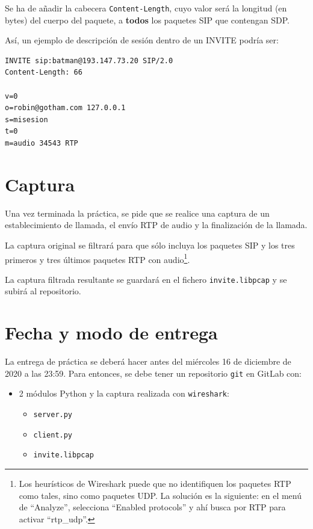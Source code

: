 \documentclass[a4paper,11pt]{article}
\begin{document}
Se ha de añadir la cabecera \texttt{Content-Length}, cuyo valor será la longitud (en bytes) del cuerpo del paquete, a {\bf todos} los paquetes SIP que contengan SDP.

Así, un ejemplo de descripción de sesión dentro de un INVITE podría ser:

\begin{verbatim}
INVITE sip:batman@193.147.73.20 SIP/2.0
Content-Length: 66

v=0
o=robin@gotham.com 127.0.0.1
s=misesion
t=0
m=audio 34543 RTP
\end{verbatim}




\section*{Captura}

Una vez terminada la práctica, se pide que se realice una captura de un
establecimiento de llamada, el envío RTP de audio y la finalización de
la llamada. 

La captura original se filtrará para que sólo incluya los paquetes
SIP y los tres primeros y tres últimos paquetes RTP con audio\footnote{Los heurísticos de Wireshark puede que no identifiquen los paquetes RTP como tales, sino como paquetes UDP. La solución es la siguiente: en el menú de ``Analyze'', selecciona ``Enabled protocols'' y ahí busca por RTP para activar ``rtp\_udp''.}.

La captura filtrada resultante se guardará en el fichero \texttt{invite.libpcap}
y se subirá al repositorio.


\section*{Fecha y modo de entrega}

La entrega de práctica se deberá hacer antes del miércoles 16 de diciembre de 2020 a las 23:59. Para entonces, se debe tener un repositorio \texttt{git} en GitLab con: 

    \begin{itemize}
        \item 2 módulos Python y la captura realizada con \texttt{wireshark}:
    \begin{itemize}
      \item \texttt{server.py}
      \item \texttt{client.py}
      \item \texttt{invite.libpcap}
    \end{itemize}
\end{itemize}
\end{document}
